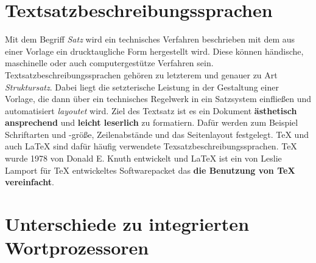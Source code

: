 \section{Textsatzbeschreibungssprachen}
Mit dem Begriff \textit{Satz} wird ein technisches Verfahren beschrieben mit dem aus einer Vorlage ein drucktaugliche Form hergestellt wird. Diese können händische, maschinelle oder auch computergestütze Verfahren sein. Textsatzbeschreibungssprachen gehören zu letzterem und genauer zu Art \textit{Struktursatz}. Dabei liegt die setzterische Leistung in der Gestaltung einer Vorlage, die dann über ein technisches Regelwerk in ein Satzsystem einfließen und automatisiert \textit{layoutet} wird. Ziel des Textsatz ist es ein Dokument \textbf{ästhetisch ansprechend} und \textbf{leicht leserlich} zu formatiern. Dafür werden zum Beispiel Schriftarten und -größe, Zeilenabstände und das Seitenlayout festgelegt.
TeX und auch LaTeX sind dafür häufig verwendete Texsatzbeschreibungssprachen. TeX wurde 1978 von Donald E. Knuth entwickelt und LaTeX ist ein von Leslie Lamport für TeX entwickeltes Softwarepacket das \textbf{die Benutzung von TeX vereinfacht}. 

\section{Unterschiede zu integrierten Wortprozessoren}
\citep{hommel:2010}
